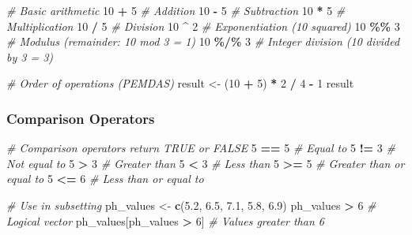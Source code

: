 \documentclass[
  10pt,
  b5paper,
  oneside]{book}
\newenvironment{Shaded}{\begin{snugshade}}{\end{snugshade}}
\newcommand{\CommentTok}[1]{\textcolor[rgb]{0.56,0.35,0.01}{\textit{#1}}}
\newcommand{\DecValTok}[1]{\textcolor[rgb]{0.00,0.00,0.81}{#1}}
\newcommand{\FloatTok}[1]{\textcolor[rgb]{0.00,0.00,0.81}{#1}}
\newcommand{\FunctionTok}[1]{\textcolor[rgb]{0.13,0.29,0.53}{\textbf{#1}}}
\newcommand{\NormalTok}[1]{#1}
\newcommand{\OtherTok}[1]{\textcolor[rgb]{0.56,0.35,0.01}{#1}}
\newcommand{\SpecialCharTok}[1]{\textcolor[rgb]{0.81,0.36,0.00}{\textbf{#1}}}
\begin{document}
\begin{Shaded}
\begin{Highlighting}[]
\CommentTok{\# Basic arithmetic}
\DecValTok{10} \SpecialCharTok{+} \DecValTok{5}      \CommentTok{\# Addition}
\DecValTok{10} \SpecialCharTok{{-}} \DecValTok{5}      \CommentTok{\# Subtraction}
\DecValTok{10} \SpecialCharTok{*} \DecValTok{5}      \CommentTok{\# Multiplication}
\DecValTok{10} \SpecialCharTok{/} \DecValTok{5}      \CommentTok{\# Division}
\DecValTok{10} \SpecialCharTok{\^{}} \DecValTok{2}      \CommentTok{\# Exponentiation (10 squared)}
\DecValTok{10} \SpecialCharTok{\%\%} \DecValTok{3}     \CommentTok{\# Modulus (remainder: 10 mod 3 = 1)}
\DecValTok{10} \SpecialCharTok{\%/\%} \DecValTok{3}    \CommentTok{\# Integer division (10 divided by 3 = 3)}

\CommentTok{\# Order of operations (PEMDAS)}
\NormalTok{result }\OtherTok{\textless{}{-}}\NormalTok{ (}\DecValTok{10} \SpecialCharTok{+} \DecValTok{5}\NormalTok{) }\SpecialCharTok{*} \DecValTok{2} \SpecialCharTok{/} \DecValTok{4} \SpecialCharTok{{-}} \DecValTok{1}
\NormalTok{result}
\end{Highlighting}
\end{Shaded}

\subsubsection{Comparison Operators}\label{comparison-operators}

\begin{Shaded}
\begin{Highlighting}[]
\CommentTok{\# Comparison operators return TRUE or FALSE}
\DecValTok{5} \SpecialCharTok{==} \DecValTok{5}      \CommentTok{\# Equal to}
\DecValTok{5} \SpecialCharTok{!=} \DecValTok{3}      \CommentTok{\# Not equal to}
\DecValTok{5} \SpecialCharTok{\textgreater{}} \DecValTok{3}       \CommentTok{\# Greater than}
\DecValTok{5} \SpecialCharTok{\textless{}} \DecValTok{3}       \CommentTok{\# Less than}
\DecValTok{5} \SpecialCharTok{\textgreater{}=} \DecValTok{5}      \CommentTok{\# Greater than or equal to}
\DecValTok{5} \SpecialCharTok{\textless{}=} \DecValTok{6}      \CommentTok{\# Less than or equal to}

\CommentTok{\# Use in subsetting}
\NormalTok{ph\_values }\OtherTok{\textless{}{-}} \FunctionTok{c}\NormalTok{(}\FloatTok{5.2}\NormalTok{, }\FloatTok{6.5}\NormalTok{, }\FloatTok{7.1}\NormalTok{, }\FloatTok{5.8}\NormalTok{, }\FloatTok{6.9}\NormalTok{)}
\NormalTok{ph\_values }\SpecialCharTok{\textgreater{}} \DecValTok{6}                     \CommentTok{\# Logical vector}
\NormalTok{ph\_values[ph\_values }\SpecialCharTok{\textgreater{}} \DecValTok{6}\NormalTok{]          }\CommentTok{\# Values greater than 6}
\end{Highlighting}
\end{Shaded}
\end{document}
